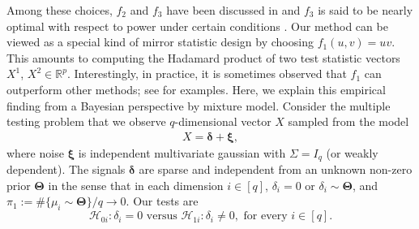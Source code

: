 \documentclass[12pt]{article}
\newcommand{\R}{\mathbb{R}}
\newcommand{\cH}{\mathcal{H}}
\theoremstyle{plain}
\begin{document}
Among these choices, $f_2$ and $f_3$ have been discussed in \cite{xing2021controlling,dai2023scale,dai2022false} and $f_3$ is said to be nearly optimal with respect to power under certain conditions \citep{dai2022false}. Our method can be viewed as a special kind of mirror statistic design by choosing $f_1(u, v)=u v$. This amounts to computing the Hadamard product
of two test statistic vectors $X^1$, $X^2\in \R^{p}$. 
Interestingly, in practice, it is sometimes observed that $f_1$ can outperform other methods; see \cite{dai2023scale,du2021false} for examples. Here, we explain this empirical finding from a Bayesian perspective by mixture model. Consider the multiple testing problem that we observe $q$-dimensional vector $X$ sampled from the model 
\begin{equation}\label{eq:toy-model}
	\begin{aligned}
		X=\boldsymbol{\delta} + \boldsymbol{\xi},
	\end{aligned}
\end{equation} 
where noise $\boldsymbol{\xi}$ is independent multivariate gaussian with $\Sigma=I_q$ (or weakly dependent). The signals $\boldsymbol{\delta}$ are sparse and independent from an unknown non-zero prior $\mathbf{\Theta}$ in the sense that in each dimension $i\in [q]$, $\delta_i=0 $ or $\delta_i\sim \mathbf{\Theta} $, and $\pi_1:= \#\{\mu_i\sim \mathbf{\Theta}  \}/q \to 0$.  Our tests are 
$$\cH_{0i}: \delta_i=0 \text{ versus } \cH_{1i}: \delta_i\neq 0, \text{ for every } i\in[q].  $$
\end{document}
